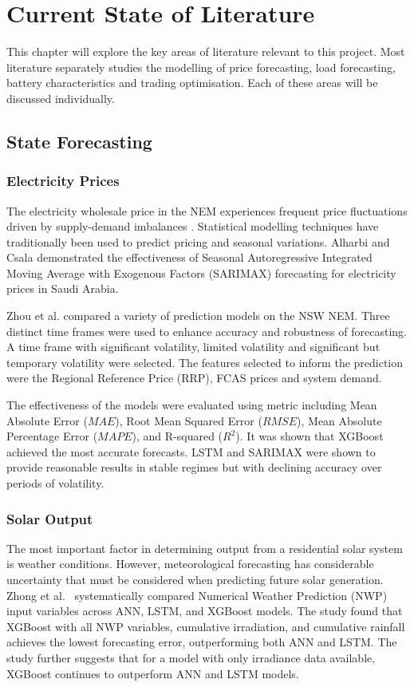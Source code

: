 \chapter{Current State of Literature}
This chapter will explore the key areas of literature relevant to this project. Most literature separately studies the modelling of price forecasting, load forecasting, battery characteristics and trading optimisation. Each of these areas will be discussed individually.


\section{State Forecasting}
\subsection{Electricity Prices}
\label{sub:forecast:price}
The electricity wholesale price in the NEM experiences frequent price fluctuations driven by supply-demand imbalances \cite{mayer2018electricity}. Statistical modelling techniques have traditionally been used to predict pricing and seasonal variations. Alharbi and Csala \cite{alharbi2022sarimax} demonstrated the effectiveness of Seasonal Autoregressive Integrated Moving Average with Exogenous Factors (SARIMAX) forecasting for electricity prices in Saudi Arabia.  \par
Zhou et al. \cite{zhou2025nem} compared a variety of prediction models on the NSW NEM. Three distinct time frames were used to enhance accuracy and robustness of forecasting. A time frame with significant volatility, limited volatility and significant but temporary volatility were selected. The features selected to inform the prediction were the Regional Reference Price (RRP), FCAS prices and system demand. \par
The effectiveness of the models were evaluated using metric including Mean Absolute Error ($MAE$), Root Mean Squared Error ($RMSE$), Mean Absolute Percentage Error ($MAPE$), and R-squared ($R^2$). It was shown that XGBoost achieved the most accurate forecasts. LSTM and SARIMAX were shown to provide reasonable results in stable regimes but with declining accuracy over periods of volatility. 

\subsection{Solar Output}
\label{sub:forecast:solar}
The most important factor in determining output from a residential solar system is weather conditions. However, meteorological forecasting has considerable uncertainty that must be considered when predicting future solar generation. Zhong et al.\ \cite{zhong2020solar} systematically compared Numerical Weather Prediction (NWP) input variables across ANN, LSTM, and XGBoost models. The study found that XGBoost with all NWP variables, cumulative irradiation, and cumulative rainfall achieves the lowest forecasting error, outperforming both ANN and LSTM. The study further suggests that for a model with only irradiance data available, XGBoost continues to outperform ANN and LSTM models.

